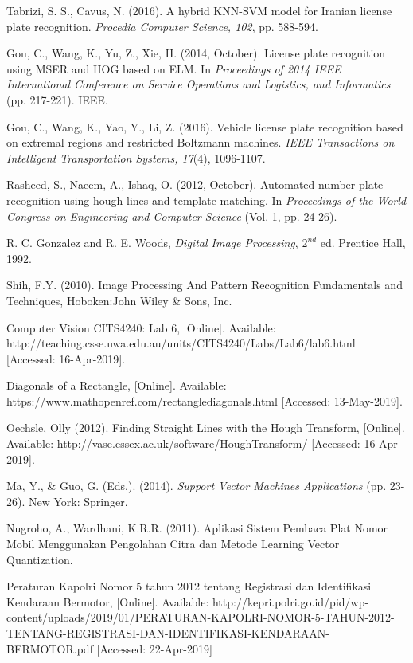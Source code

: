 \begin{thebibliography}{7}

{Tabrizi, S. S., Cavus, N. (2016). A hybrid KNN-SVM model for Iranian license plate recognition. \emph{Procedia Computer Science, 102}, pp. 588-594.}

{Gou, C., Wang, K., Yu, Z., Xie, H. (2014, October). License plate recognition using MSER and HOG based on ELM. In \emph{Proceedings of 2014 IEEE International Conference on Service Operations and Logistics, and Informatics} (pp. 217-221). IEEE.}

{Gou, C., Wang, K., Yao, Y., Li, Z. (2016). Vehicle license plate recognition based on extremal regions and restricted Boltzmann machines. \emph{IEEE Transactions on Intelligent Transportation Systems, 17}(4), 1096-1107.}

{Rasheed, S., Naeem, A., Ishaq, O. (2012, October). Automated number plate recognition using hough lines and template matching. In \emph{Proceedings of the World Congress on Engineering and Computer Science} (Vol. 1, pp. 24-26).}

{R. C. Gonzalez and R. E. Woods, \emph{Digital Image Processing}, $2^{nd}$ ed. Prentice Hall, 1992.}

{Shih, F.Y. (2010). Image Processing And Pattern Recognition Fundamentals and Techniques, Hoboken:John Wiley \& Sons, Inc.}

{Computer Vision CITS4240: Lab 6, [Online]. Available: http://teaching.csse.uwa.edu.au/units/CITS4240/Labs/Lab6/lab6.html [Accessed: 16-Apr-2019].}

{Diagonals of a Rectangle, [Online]. Available: https://www.mathopenref.com/rectanglediagonals.html [Accessed: 13-May-2019].}

{Oechsle, Olly (2012). Finding Straight Lines with the Hough Transform, [Online]. Available: http://vase.essex.ac.uk/software/HoughTransform/ [Accessed: 16-Apr-2019].}

{Ma, Y., \& Guo, G. (Eds.). (2014). \textit{Support Vector Machines Applications} (pp. 23-26). New York: Springer.}

{Nugroho, A., Wardhani, K.R.R. (2011). Aplikasi Sistem Pembaca Plat Nomor Mobil Menggunakan Pengolahan Citra dan Metode Learning Vector Quantization.}

{Peraturan Kapolri Nomor 5 tahun 2012 tentang Registrasi dan Identifikasi Kendaraan Bermotor, [Online]. Available: http://kepri.polri.go.id/pid/wp-content/uploads/2019/01/PERATURAN-KAPOLRI-NOMOR-5-TAHUN-2012-TENTANG-REGISTRASI-DAN-IDENTIFIKASI-KENDARAAN-BERMOTOR.pdf [Accessed: 22-Apr-2019]}


\end{thebibliography}
